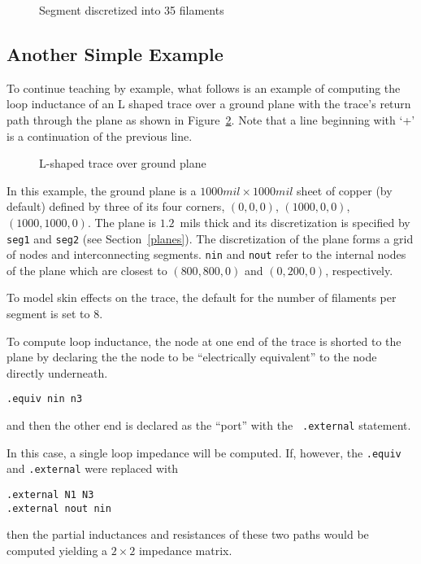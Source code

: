 \begin{figure}
\centerline{
}
\caption{Segment discretized into 35 filaments}
\label{E1}
\end{figure}

\subsection{Another Simple Example}
\label{another}

To continue teaching by example, what follows is an example of
computing the loop inductance of an L
shaped trace over a ground plane with the trace's return path through
the plane as shown in 
Figure~\ref{simple_gp}.  Note that a line beginning with `+' is a
continuation of the previous line.

\begin{figure}
\centerline{
}
\caption{L-shaped trace over ground plane}
\label{simple_gp}
\end{figure}

\noindent
{}


In this example, the ground plane is a $1000 mil \times 1000 mil$ sheet of
copper (by default) defined by three of its four corners, $(0,0,0)$,
$(1000,0,0)$, $(1000,1000,0)$.  The plane is $1.2$~mils thick and
its discretization is specified by {\tt seg1} and {\tt seg2} (see
Section~\ref{planes}).  The discretization of the plane forms a grid of
nodes and interconnecting segments.  {\tt nin} and {\tt nout} refer to
the internal nodes of the plane which are closest to $(800,800,0)$ and
$(0,200,0)$, respectively.  
 
To model skin effects on the trace, the default for the number of
filaments per segment is set to $8$.

To compute loop inductance, the node at one end of the trace is
shorted to the plane by declaring the
the node to be ``electrically equivalent'' to the node directly underneath.
\begin{verbatim}
.equiv nin n3
\end{verbatim}
and then the other end is declared as the ``port'' with the {\tt
.external} statement.

In this case, a single loop impedance will be computed.  If, however, the
{\tt .equiv} and {\tt .external} were replaced with
\begin{verbatim}
.external N1 N3
.external nout nin
\end{verbatim}
then the partial inductances and resistances of these two paths would
be computed yielding a $2 \times 2$ impedance matrix.

